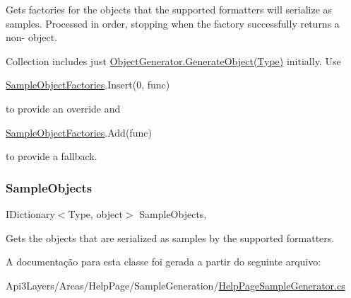 Gets factories for the objects that the supported formatters will serialize as samples. Processed in order, stopping when the factory successfully returns a non-\/ object. 

Collection includes just \hyperlink{classApi3Layers_1_1Areas_1_1HelpPage_1_1ObjectGenerator_a5a661e03cac6c900f73a7e9e6e2d205d}{Object\+Generator.\+Generate\+Object(\+Type)} initially. Use 
\begin{DoxyCode}
\hyperlink{classApi3Layers_1_1Areas_1_1HelpPage_1_1HelpPageSampleGenerator_afe79b8cfae9329d64220589984337741}{SampleObjectFactories}.Insert(0, func)
\end{DoxyCode}
 to provide an override and 
\begin{DoxyCode}
\hyperlink{classApi3Layers_1_1Areas_1_1HelpPage_1_1HelpPageSampleGenerator_afe79b8cfae9329d64220589984337741}{SampleObjectFactories}.Add(func)
\end{DoxyCode}
 to provide a fallback.\mbox{\label{classApi3Layers_1_1Areas_1_1HelpPage_1_1HelpPageSampleGenerator_a74c69a35009188bdaff61af066b34aaa}} 
\subsubsection{\texorpdfstring{Sample\+Objects}{SampleObjects}}
{\footnotesize\ttfamily I\+Dictionary$<$Type, object$>$ Sample\+Objects\hspace{0.3cm}{\ttfamily [get]}, {\ttfamily [set]}}



Gets the objects that are serialized as samples by the supported formatters. 



A documentação para esta classe foi gerada a partir do seguinte arquivo\+:\begin{DoxyCompactItemize}
\item 
Api3\+Layers/\+Areas/\+Help\+Page/\+Sample\+Generation/\hyperlink{HelpPageSampleGenerator_8cs}{Help\+Page\+Sample\+Generator.\+cs}\end{DoxyCompactItemize}
